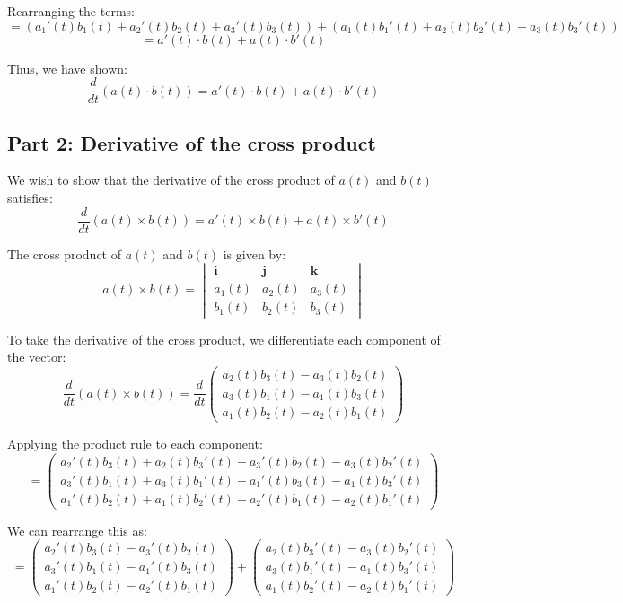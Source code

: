 \documentclass[11pt]{article}
\begin{document}
Rearranging the terms:
\[
= \left( a_1'(t) b_1(t) + a_2'(t) b_2(t) + a_3'(t) b_3(t) \right) + \left( a_1(t) b_1'(t) + a_2(t) b_2'(t) + a_3(t) b_3'(t) \right)
\]
\[
= a'(t) \cdot b(t) + a(t) \cdot b'(t)
\]

Thus, we have shown:
\[
\frac{d}{dt} \left( a(t) \cdot b(t) \right) = a'(t) \cdot b(t) + a(t) \cdot b'(t)
\]

\newpage

\subsection{Part 2: Derivative of the cross product}

We wish to show that the derivative of the cross product of \( a(t) \) and \( b(t) \) satisfies:
\[
\frac{d}{dt} \left( a(t) \times b(t) \right) = a'(t) \times b(t) + a(t) \times b'(t)
\]

The cross product of \( a(t) \) and \( b(t) \) is given by:
\[
a(t) \times b(t) = \begin{vmatrix} \mathbf{i} & \mathbf{j} & \mathbf{k} \\ a_1(t) & a_2(t) & a_3(t) \\ b_1(t) & b_2(t) & b_3(t) \end{vmatrix}
\]

To take the derivative of the cross product, we differentiate each component of the vector:
\[
\frac{d}{dt} \left( a(t) \times b(t) \right) = \frac{d}{dt} \begin{pmatrix} a_2(t)b_3(t) - a_3(t)b_2(t) \\ a_3(t)b_1(t) - a_1(t)b_3(t) \\ a_1(t)b_2(t) - a_2(t)b_1(t) \end{pmatrix}
\]

Applying the product rule to each component:
\[
= \begin{pmatrix} a_2'(t)b_3(t) + a_2(t)b_3'(t) - a_3'(t)b_2(t) - a_3(t)b_2'(t) \\ a_3'(t)b_1(t) + a_3(t)b_1'(t) - a_1'(t)b_3(t) - a_1(t)b_3'(t) \\ a_1'(t)b_2(t) + a_1(t)b_2'(t) - a_2'(t)b_1(t) - a_2(t)b_1'(t) \end{pmatrix}
\]

We can rearrange this as:
\[
= \begin{pmatrix} a_2'(t)b_3(t) - a_3'(t)b_2(t) \\ a_3'(t)b_1(t) - a_1'(t)b_3(t) \\ a_1'(t)b_2(t) - a_2'(t)b_1(t) \end{pmatrix} + \begin{pmatrix} a_2(t)b_3'(t) - a_3(t)b_2'(t) \\ a_3(t)b_1'(t) - a_1(t)b_3'(t) \\ a_1(t)b_2'(t) - a_2(t)b_1'(t) \end{pmatrix}
\]
\end{document}
